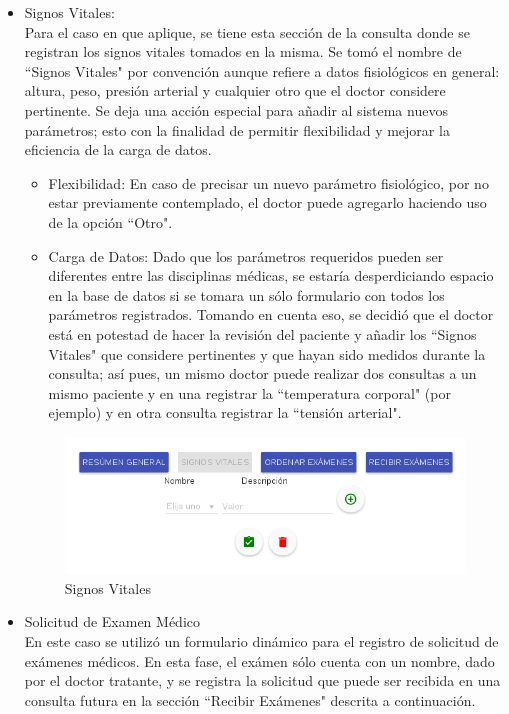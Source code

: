 \begin{itemize}
        \item Signos Vitales:\\
        Para el caso en que aplique, se tiene esta sección de la consulta donde se registran los signos vitales tomados en la misma. Se tomó el nombre de ``Signos Vitales" por convención aunque refiere a datos fisiológicos en general: altura, peso, presión arterial y cualquier otro que el doctor considere pertinente. Se deja una acción especial para añadir al sistema nuevos parámetros; esto con la finalidad de permitir flexibilidad y mejorar la eficiencia de la carga de datos.
            \begin{itemize}
                \item Flexibilidad: En caso de precisar un nuevo parámetro fisiológico, por no estar previamente contemplado, el doctor puede agregarlo haciendo uso de la opción ``Otro".
                \item Carga de Datos: Dado que los parámetros requeridos pueden ser diferentes entre las disciplinas médicas, se estaría desperdiciando espacio en la base de datos si se tomara un sólo formulario con todos los parámetros registrados. Tomando en cuenta eso, se decidió que el doctor está en potestad de hacer la revisión del paciente y añadir los ``Signos Vitales" que considere pertinentes y que hayan sido medidos durante la consulta; así pues, un mismo doctor puede realizar dos consultas a un mismo paciente y en una registrar la ``temperatura corporal" (por ejemplo) y en otra consulta registrar la ``tensión arterial".
            \end{itemize}
            
            \begin{figure}[htb!]
                \begin{center}
                    \includegraphics[width=.9\linewidth,keepaspectratio=true]{figures/consulta2}
                \end{center}
                \caption{Signos Vitales}
                \label{img-signovital}
            \end{figure}
        \item Solicitud de Examen Médico\\
        En este caso se utilizó un formulario dinámico para el registro de solicitud de exámenes médicos. En esta fase, el exámen sólo cuenta con un nombre, dado por el doctor tratante, y se registra la solicitud que puede ser recibida en una consulta futura en la sección ``Recibir Exámenes" descrita a continuación.
        

\end{itemize}
